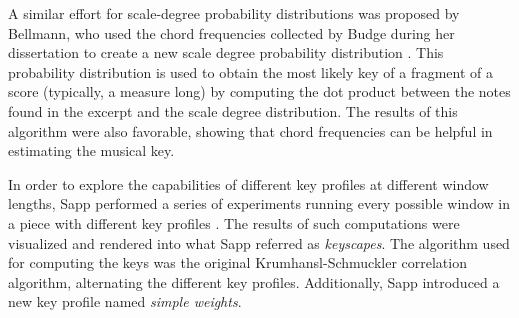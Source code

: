 A similar effort for scale-degree probability distributions
was proposed by Bellmann, who used the chord frequencies
collected by Budge during her dissertation
\cite{budge1943study} to create a new scale degree
probability distribution \cite{bellmann2006about}. This
probability distribution is used to obtain the most likely
key of a fragment of a score (typically, a measure long) by
computing the dot product between the notes found in the
excerpt and the scale degree distribution. The results of
this algorithm were also favorable, showing that chord
frequencies can be helpful in estimating the musical key.






In order to explore the capabilities of different key
profiles at different window lengths, Sapp performed a
series of experiments running every possible window in a
piece with different key profiles
\cite{sapp2011computational}. The results of such
computations were visualized and rendered into what Sapp
referred as \emph{keyscapes}. The algorithm used for
computing the keys was the original Krumhansl-Schmuckler
correlation algorithm, alternating the different key
profiles. Additionally, Sapp introduced a new key profile
named \emph{simple weights}.

